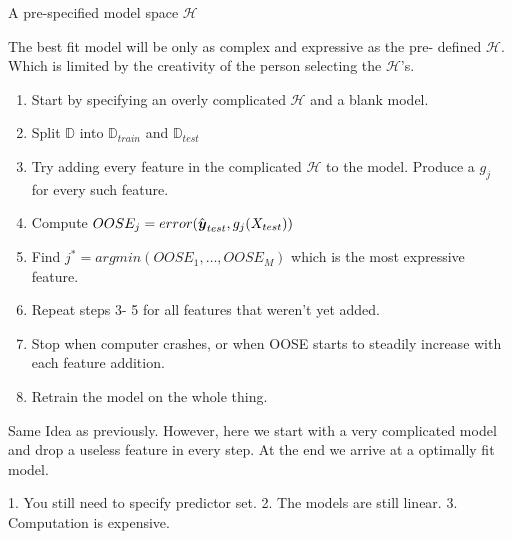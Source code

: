 \documentclass[12pt]{article}
\begin{document}
\begin{enumerate}


A pre-specified model space $\mathcal{H}$


The best fit model will be only as complex and expressive as the pre- defined $\mathcal{H}$. Which is limited by the creativity of the person selecting the $\mathcal{H}$'s. 


\begin{enumerate}[1.]
\item Start by specifying an overly complicated $\mathcal{H}$ and a blank model. 
\item Split $\mathbb{D}$ into $\mathbb{D}_{train}$ and $\mathbb{D}_{test}$
\item Try adding every feature in the complicated $\mathcal{H}$ to the model. Produce a $g_j$ for every such feature. 
\item Compute $OOSE_j = error( \hat{\boldsymbol{y}}_{test}, g_j (X_{test}))$
\item Find $j^*= argmin (OOSE_1, \dots, OOSE_M)$ which is the most expressive feature.
\item Repeat steps 3- 5 for all features that weren't yet added. 
\item Stop when computer crashes, or when OOSE starts to steadily increase with each feature addition. 
\item Retrain the model on the whole thing. 

\end{enumerate}


Same Idea as previously. However, here we start with a very complicated model and drop a useless feature in every step. At the end we arrive at a optimally fit model. 

1. You still need to specify predictor set. 2. The models are still linear. 3. Computation is expensive. 


\end{enumerate}
\end{document}
